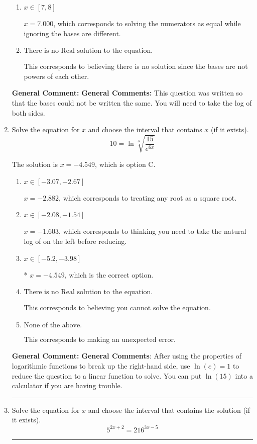 \documentclass{extbook}[14pt]
\newcommand{\litem}[1]{\item #1

\rule{\textwidth}{0.4pt}}
\begin{document}
\begin{enumerate}
{\begin{enumerate}[label=\Alph*.]
$x = -25.970$, which corresponds to distributing the $\ln(base)$ to the second term of the exponent only.
\item \( x \in [7, 8] \)

$x = 7.000$, which corresponds to solving the numerators as equal while ignoring the bases are different.
\item \( \text{There is no Real solution to the equation.} \)

This corresponds to believing there is no solution since the bases are not powers of each other.
\end{enumerate}

\textbf{General Comment:} \textbf{General Comments:} This question was written so that the bases could not be written the same. You will need to take the log of both sides.
}
\litem{
 Solve the equation for $x$ and choose the interval that contains $x$ (if it exists).
\[  10 = \ln{\sqrt[3]{\frac{15}{e^{6x}}}} \]

The solution is \( x = -4.549 \), which is option C.\begin{enumerate}[label=\Alph*.]
\item \( x \in [-3.07, -2.67] \)

$x = -2.882$, which corresponds to treating any root as a square root.
\item \( x \in [-2.08, -1.54] \)

$x = -1.603$, which corresponds to thinking you need to take the natural log of on the left before reducing.
\item \( x \in [-5.2, -3.98] \)

* $x = -4.549$, which is the correct option.
\item \( \text{There is no Real solution to the equation.} \)

This corresponds to believing you cannot solve the equation.
\item \( \text{None of the above.} \)

This corresponds to making an unexpected error.
\end{enumerate}

\textbf{General Comment:} \textbf{General Comments}: After using the properties of logarithmic functions to break up the right-hand side, use $\ln(e) = 1$ to reduce the question to a linear function to solve. You can put $\ln(15)$ into a calculator if you are having trouble.
}
\litem{
Solve the equation for $x$ and choose the interval that contains the solution (if it exists).
\[ 5^{2x+2} = 216^{3x-5} \]

}
\end{enumerate}
\end{document}
